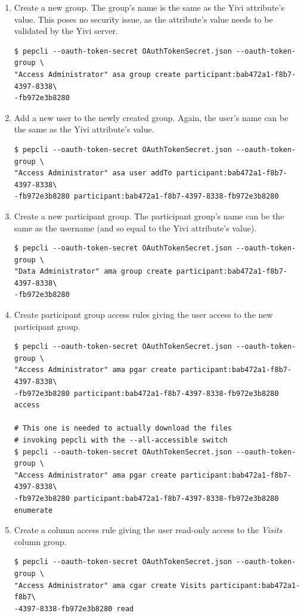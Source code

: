 \documentclass{report}
\begin{document}
\begin{enumerate}

\item Create a new group. The group's name is the same as the Yivi attribute's value. This poses no security issue, as the attribute's value needs to be validated by the Yivi server.
\begin{verbatim}
$ pepcli --oauth-token-secret OAuthTokenSecret.json --oauth-token-group \
"Access Administrator" asa group create participant:bab472a1-f8b7-4397-8338\
-fb972e3b8280
\end{verbatim}

\item Add a new user to the newly created group. Again, the user's name can be the same as the Yivi attribute's value.
\begin{verbatim}
$ pepcli --oauth-token-secret OAuthTokenSecret.json --oauth-token-group \
"Access Administrator" asa user addTo participant:bab472a1-f8b7-4397-8338\
-fb972e3b8280 participant:bab472a1-f8b7-4397-8338-fb972e3b8280
\end{verbatim}

\item Create a new participant group. The participant group's name can be the same as the username (and so equal to the Yivi attribute's value).
\begin{verbatim}
$ pepcli --oauth-token-secret OAuthTokenSecret.json --oauth-token-group \
"Data Administrator" ama group create participant:bab472a1-f8b7-4397-8338\
-fb972e3b8280
\end{verbatim}

\item Create participant group access rules giving the user access to the new participant group. 
\begin{verbatim}
$ pepcli --oauth-token-secret OAuthTokenSecret.json --oauth-token-group \
"Access Administrator" ama pgar create participant:bab472a1-f8b7-4397-8338\
-fb972e3b8280 participant:bab472a1-f8b7-4397-8338-fb972e3b8280 access

# This one is needed to actually download the files 
# invoking pepcli with the --all-accessible switch
$ pepcli --oauth-token-secret OAuthTokenSecret.json --oauth-token-group \
"Access Administrator" ama pgar create participant:bab472a1-f8b7-4397-8338\
-fb972e3b8280 participant:bab472a1-f8b7-4397-8338-fb972e3b8280 enumerate
\end{verbatim}


\item Create a column access rule giving the user read-only access to the \textit{Visits} column group.
\begin{verbatim}
$ pepcli --oauth-token-secret OAuthTokenSecret.json --oauth-token-group \
"Access Administrator" ama cgar create Visits participant:bab472a1-f8b7\
-4397-8338-fb972e3b8280 read
\end{verbatim}


\end{enumerate}
\end{document}

